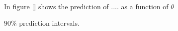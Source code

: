 In figure \ref{} shows the prediction of .... as a function of $\theta$ 

$90\%$ prediction intervals. 

